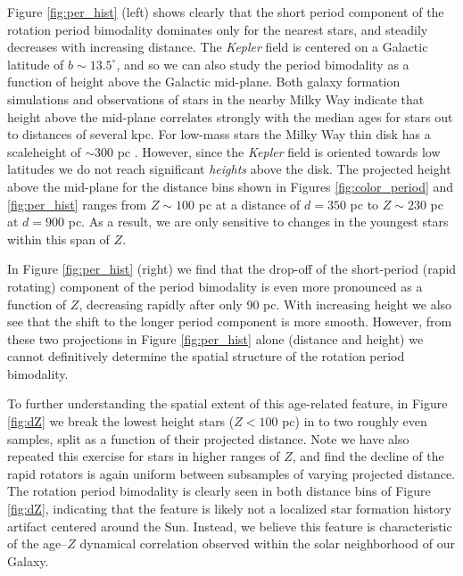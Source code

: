 \documentclass[preprint2]{aastex62}
\newcommand{\Kepler}{\textsl{Kepler}\xspace}
\begin{document}
Figure \ref{fig:per_hist} (left) shows clearly that the short period component of the rotation period bimodality dominates only for the nearest stars, and steadily decreases with increasing distance.
The \Kepler field is centered on a Galactic latitude of $b\sim13.5^\circ$, and so we can also study the period bimodality as a function of height above the Galactic mid-plane.
Both galaxy formation simulations \citep{ma2017} and observations of stars in the nearby Milky Way \citep{xiang2017} indicate that height above the mid-plane correlates strongly with the median ages for stars out to distances of several kpc. For low-mass stars the Milky Way thin disk has a scaleheight of $\sim$300 pc \citep{gilmore1983}.
However, since the \Kepler field is oriented towards low latitudes we do not reach significant {\it heights} above the disk.
The projected height above the mid-plane for the distance bins shown in Figures \ref{fig:color_period} and \ref{fig:per_hist} ranges from $Z\sim100$ pc at a distance of $d=350$ pc to $Z\sim230$ pc at $d=900$ pc. As a result, we are only sensitive to changes in the youngest stars within this span of $Z$.

In Figure \ref{fig:per_hist} (right) we find that the drop-off of the short-period (rapid rotating) component of the period bimodality is even more pronounced as a function of $Z$, decreasing rapidly after only 90 pc. With increasing height we also see that the shift to the longer period component is more smooth. However, from these two projections in Figure \ref{fig:per_hist} alone (distance and height) we cannot definitively determine the spatial structure of the rotation period bimodality.


To further understanding the spatial extent of this age-related feature, in Figure \ref{fig:dZ} we break the lowest height stars ($Z < 100$ pc) in to two roughly even samples, split as a function of their projected distance. Note we have also repeated this exercise for stars in higher ranges of $Z$, and find the decline of the rapid rotators is again uniform between subsamples of varying projected distance. The rotation period bimodality is clearly seen in both distance bins of Figure \ref{fig:dZ}, indicating that the feature is likely not a localized star formation history artifact centered around the Sun. Instead, we believe this feature is characteristic of the age--$Z$ dynamical correlation observed within the solar neighborhood of our Galaxy. 
\end{document}
